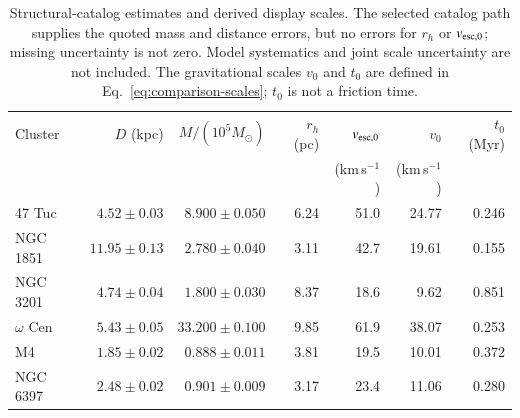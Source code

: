 \begin{table}[t]
\caption{Structural-catalog estimates and derived display scales. The selected catalog path supplies the quoted mass and distance errors, but no errors for $r_h$ or $v_{\rm esc,0}$; missing uncertainty is not zero. Model systematics and joint scale uncertainty are not included. The gravitational scales $v_0$ and $t_0$ are defined in Eq.~\eqref{eq:comparison-scales}; $t_0$ is not a friction time.}\label{tab:cluster-scales}
\centering\begin{tabular}{lrrrrrr}
\toprule
Cluster & $D$ (kpc) & $M/(10^5 M_\odot)$ & $r_h$ (pc) & $v_{\rm esc,0}$ & $v_0$ & $t_0$ (Myr) \\
 & & & & (km\,s$^{-1}$) & (km\,s$^{-1}$) & \\
\midrule
47 Tuc & $4.52\pm0.03$ & $8.900\pm0.050$ & 6.24 & 51.0 & 24.77 & 0.246 \\
NGC 1851 & $11.95\pm0.13$ & $2.780\pm0.040$ & 3.11 & 42.7 & 19.61 & 0.155 \\
NGC 3201 & $4.74\pm0.04$ & $1.800\pm0.030$ & 8.37 & 18.6 & 9.62 & 0.851 \\
$\omega$ Cen & $5.43\pm0.05$ & $33.200\pm0.100$ & 9.85 & 61.9 & 38.07 & 0.253 \\
M4 & $1.85\pm0.02$ & $0.888\pm0.011$ & 3.81 & 19.5 & 10.01 & 0.372 \\
NGC 6397 & $2.48\pm0.02$ & $0.901\pm0.009$ & 3.17 & 23.4 & 11.06 & 0.280 \\
\bottomrule
\end{tabular}
\end{table}

